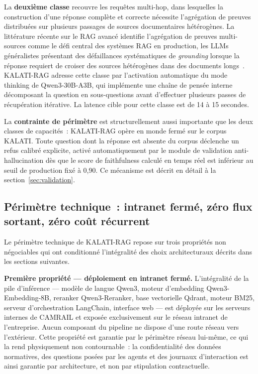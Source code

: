 \documentclass[12pt,a4paper]{report}
\begin{document}
La \textbf{deuxième classe} recouvre les requêtes multi-hop, dans lesquelles la construction
d'une réponse complète et correcte nécessite l'agrégation de preuves distribuées sur plusieurs
passages de sources documentaires hétérogènes. La littérature récente sur le RAG avancé
identifie l'agrégation de preuves multi-sources comme le défi central des systèmes RAG en
production, les LLMs généralistes présentant des défaillances systématiques de
\textit{grounding} lorsque la réponse requiert de croiser des sources hétérogènes dans des
documents longs~\autocite{Gao2025}. KALATI-RAG adresse cette classe par l'activation automatique
du mode thinking de Qwen3-30B-A3B, qui implémente une chaîne de pensée interne décomposant
la question en sous-questions avant d'effectuer plusieurs passes de récupération itérative.
La latence cible pour cette classe est de 14 à 15 secondes.

La \textbf{contrainte de périmètre} est structurellement aussi importante que les deux classes
de capacités~: KALATI-RAG opère en monde fermé sur le corpus KALATI. Toute question dont la
réponse est absente du corpus déclenche un refus calibré explicite, activé automatiquement
par le module de validation anti-hallucination dès que le score de faithfulness calculé en
temps réel est inférieur au seuil de production fixé à 0,90. Ce mécanisme est décrit en détail
à la section~\ref{sec:validation}.

\subsection*{Périmètre technique~: intranet fermé, zéro flux sortant, zéro coût récurrent}

Le périmètre technique de KALATI-RAG repose sur trois propriétés non négociables qui ont
conditionné l'intégralité des choix architecturaux décrits dans les sections suivantes.

\textbf{Première propriété --- déploiement en intranet fermé.} L'intégralité de la pile
d'inférence --- modèle de langue Qwen3, moteur d'embedding Qwen3-Embedding-8B, reranker
Qwen3-Reranker, base vectorielle Qdrant, moteur BM25, serveur d'orchestration LangChain,
interface web --- est déployée sur les serveurs internes de CAMRAIL et exposée exclusivement
sur le réseau intranet de l'entreprise. Aucun composant du pipeline ne dispose d'une route
réseau vers l'extérieur. Cette propriété est garantie par le périmètre réseau lui-même,
ce qui la rend physiquement non contournable~: la confidentialité des données normatives,
des questions posées par les agents et des journaux d'interaction est ainsi garantie par
architecture, et non par stipulation contractuelle.
\end{document}
